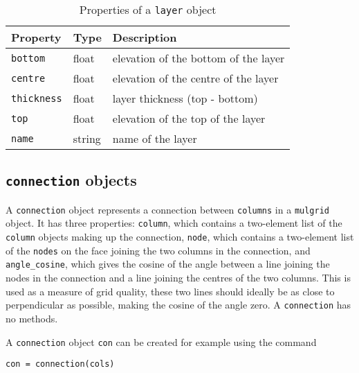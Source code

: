 \begin{table}
  \begin{center}
    \begin{tabular}{|l|l|l|}
      \hline
      \textbf{Property} & \textbf{Type} & \textbf{Description}\\
      \hline
      \texttt{bottom} & float & elevation of the bottom of the layer \\
      \texttt{centre} & float & elevation of the centre of the layer \\
      \texttt{thickness} & float & layer thickness (top - bottom) \\
      \texttt{top} & float & elevation of the top of the layer \\
      \texttt{name} & string & name of the layer \\
      \hline
    \end{tabular}
    \caption{Properties of a \texttt{layer} object}
    \label{tb:layer_properties}
  \end{center}
\end{table}

\subsection{\texttt{connection} objects}
\label{connectionobjects}

A \texttt{connection} object represents a connection between \texttt{columns} in a \texttt{mulgrid} object.  It has three properties: \texttt{column}, which contains a two-element list of the \texttt{column} objects making up the connection, \texttt{node}, which contains a two-element list of the \texttt{nodes} on the face joining the two columns in the connection, and \texttt{angle\_cosine}, which gives the cosine of the angle between a line joining the nodes in the connection and a line joining the centres of the two columns.  This is used as a measure of grid quality, these two lines should ideally be as close to perpendicular as possible, making the cosine of the angle zero.  A \texttt{connection} has no methods.

A \texttt{connection} object \texttt{con} can be created for example using the command

\begin{lstlisting}
con = connection(cols)
\end{lstlisting}

